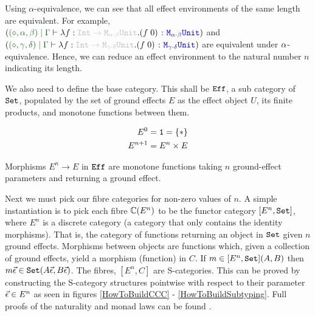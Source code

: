 \documentclass{Report}
\begin{document}
Using $\alpha$-equivalence, we can see that all effect environments of the same length are equivalent. For example, $(\etyperelation{(\nil, \a, \b)}{\G}{\lam{f}{\fntype{\texttt{Int}}{\M{\a\dot\b}{\U}}}{(\apply{f}{0})}}{\M{\a\dot\b}{\U}})$ and $(\etyperelation{(\nil, \g, \d)}{\G}{\lam{f}{\fntype{\texttt{Int}}{\M{\g\dot\d}{\U}}}{(\apply{f}{0})}}{\M{\g\dot\d}{\U}})$ are equivalent under $\alpha$-equivalence. Hence, we can reduce an effect environment to the natural number $n$ indicating its length.


We also need to define the base category. This shall be $\texttt{Eff}$, a sub category of $\texttt{Set}$, populated by the set of ground effects $E$ as the effect object $U$, its finite products, and monotone functions between them.

\begin{align*}
    E^0 & = \texttt{1} = \left\{\ast\right\}\\
    E^{n+1} &= E^n \times E
\end{align*}

Morphisms $E^n \rightarrow E$ in $\texttt{Eff}$ are monotone functions taking $n$ ground-effect parameters and returning a ground effect.

Next we must pick our fibre categories for non-zero values of $n$. A simple instantiation is to pick each fibre $\mathbb{C}(E^n)$ to be the functor category $[E^n, \texttt{Set}]$,  where $E^n$ is a discrete category (a category that only contains the identity morphisms). That is, the category of functions returning an object in $\texttt{Set}$ given $n$ ground effects. Morphisms between objects are functions which, given a collection of ground effects, yield a morphism (function) in $C$. If $m\in [E^n, \texttt{Set}](A, B)$ then $m\vec{\epsilon}\in\texttt{Set}(A\vec{\epsilon}, B\vec{\epsilon})$. The fibres, $[E^n, C]$ are S-categories. This can be proved by constructing the S-category structures pointwise with respect to their parameter $\vec{\epsilon} \in E^n$ as seen in figures \ref{HowToBuildCCC} - \ref{HowToBuildSubtyping}. Full proofs of the naturality and monad laws can be found .
\end{document}
